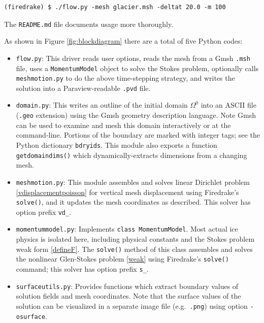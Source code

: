 \documentclass[letterpaper,final,12pt,reqno]{amsart}
\begin{document}
\medskip
\begin{Verbatim}
(firedrake) $ ./flow.py -mesh glacier.msh -deltat 20.0 -m 100
\end{Verbatim}

\medskip
\noindent The \verb|README.md| file documents usage more thoroughly.

\medskip
As shown in Figure \ref{fig:blockdiagram} there are a total of five Python codes:
\begin{itemize}
\item \texttt{flow.py}: \quad  This driver reads user options, reads the mesh from a Gmsh \texttt{.msh} file, uses a \texttt{MomentumModel} object to solve the Stokes problem, optionally calls \texttt{meshmotion.py} to do the above time-stepping strategy, and writes the solution into a Paraview-readable \texttt{.pvd} file.

\item \texttt{domain.py}: \quad  This writes an outline of the initial domain $\Omega^0$ into an ASCII file (\texttt{.geo} extension) using the Gmsh \cite{GeuzaineRemacle2009} geometry description language.  Note Gmsh can be used to examine and mesh this domain interactively or at the command-line.  Portions of the boundary are marked with integer tags; see the Python dictionary \texttt{bdryids}.  This module also exports a function \texttt{getdomaindims()} which dynamically-extracts dimensions from a changing mesh.

\item \texttt{meshmotion.py}: \quad  This module assembles and solves linear Dirichlet problem \eqref{vdisplacementpoisson} for vertical mesh displacement using Firedrake's \texttt{solve()}, and it updates the mesh coordinates as described.  This solver has option prefix \texttt{vd\_}.

\item \texttt{momentummodel.py}: \quad  Implements \texttt{class MomentumModel}.  Most actual ice physics is isolated here, including physical constants and the Stokes problem weak form \eqref{defineF}.  The \texttt{solve()} method of this class assembles and solves the nonlinear Glen-Stokes problem \eqref{weak} using Firedrake's \texttt{solve()} command; this solver has option prefix \texttt{s\_}.

\item \texttt{surfaceutils.py}: \quad  Provides functions which extract boundary values of solution fields and mesh coordinates.  Note that the surface values of the solution can be visualized in a separate image file (e.g.~\texttt{.png}) using option \texttt{-osurface}.
\end{itemize}
\end{document}
